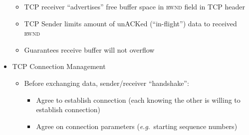 \begin{itemize}
\begin{itemize}
\begin{itemize}
        \end{itemize}

      \item TCP receiver ``advertises'' free buffer space in \textsc{rwnd} field in TCP header

      \item TCP Sender limits amount of unACKed (``in-flight'') data to received \textsc{rwnd}

      \item Guarantees receive buffer will not overflow

    \end{itemize}

  \item TCP Connection Management

    \begin{itemize}

      \item Before exchanging data, sender/receiver ``handshake'':

        \begin{itemize}

          \item Agree to establish connection (each knowing the other is willing to establish connection)

          \item Agree on connection parameters (\textit{e}.\textit{g}.\ starting sequence numbers)

        \end{itemize}

    \end{itemize}

\end{itemize}



